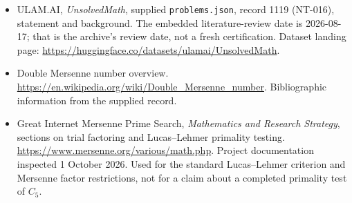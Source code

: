 \documentclass[11pt,a4paper]{article}
\begin{document}
{\small

\begin{itemize}

\item[\hypertarget{source:1119:1}{S1}] ULAM.AI, \emph{UnsolvedMath}, supplied \texttt{problems.json}, record 1119 (NT-016), statement and background. The embedded literature-review date is 2026-08-17; that is the archive’s review date, not a fresh certification. Dataset landing page: \url{https://huggingface.co/datasets/ulamai/UnsolvedMath}.

\item[\hypertarget{source:1119:2}{S2}] Double Mersenne number overview. \url{https://en.wikipedia.org/wiki/Double_Mersenne_number}. Bibliographic information from the supplied record.


\item[E1] Great Internet Mersenne Prime Search,
\emph{Mathematics and Research Strategy}, sections on trial factoring
and Lucas--Lehmer primality testing.
\url{https://www.mersenne.org/various/math.php}.
Project documentation inspected 1 October 2026. Used for the standard
Lucas--Lehmer criterion and Mersenne factor restrictions, not for a
claim about a completed primality test of $C_5$.

\end{itemize}

}

\label{end:1119}
\end{document}
